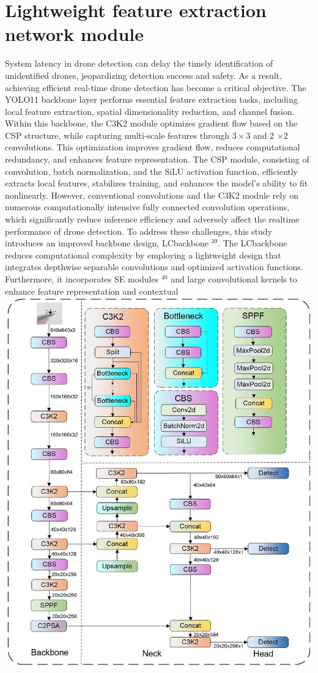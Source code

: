 \documentclass{article}
\begin{document}
\section*{Lightweight feature extraction network module}
System latency in drone detection can delay the timely identification of unidentified drones, jeopardizing detection success and safety. As a result, achieving efficient real-time drone detection has become a critical objective. The YOLO11 backbone layer performs essential feature extraction tasks, including local feature extraction, spatial dimensionality reduction, and channel fusion. Within this backbone, the C3K2 module optimizes gradient flow based on the CSP structure, while capturing multi-scale features through $3 \times 3$ and 2 $\times 2$ convolutions. This optimization improves gradient flow, reduces computational redundancy, and enhances feature representation. The CSP module, consisting of convolution, batch normalization, and the SiLU activation function, efficiently extracts local features, stabilizes training, and enhances the model's ability to fit nonlinearly. However, conventional convolutions and the C3K2 module rely on numerous computationally intensive fully connected convolution operations, which significantly reduce inference efficiency and adversely affect the realtime performance of drone detection. To address these challenges, this study introduces an improved backbone design, LCbackbone ${ }^{39}$. The LCbackbone reduces computational complexity by employing a lightweight design that integrates depthwise separable convolutions and optimized activation functions. Furthermore, it incorporates SE modules ${ }^{40}$ and large convolutional kernels to enhance feature representation and contextual\\
\includegraphics[max width=\textwidth, center]{2025_08_05_34f8389150f57116e76bg-04}
\end{document}
